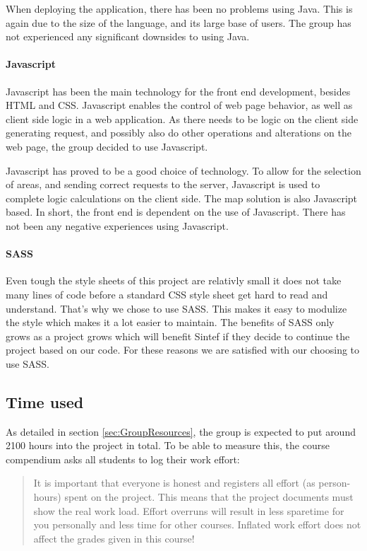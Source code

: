 \documentclass[11pt,a4paper,titlepage,oneside]{report}
\begin{document}
When deploying the application, there has been no problems using Java. This is again due to the size of the language, and its large base of users. The group has not experienced any significant downsides to using Java. 

\paragraph{Javascript}
Javascript has been the main technology for the front end development, besides \gls{HTML} and \gls{CSS}. Javascript enables the control of web page behavior, as well as client side logic in a web application. As there needs to be logic on the client side generating request, and possibly also do other operations and alterations on the web page, the group decided to use Javascript. 

Javascript has proved to be a good choice of technology. To allow for the selection of areas, and sending correct requests to the server, Javascript is used to complete logic calculations on the client side. The map solution is also Javascript based. In short, the front end is dependent on the use of Javascript. There has not been any negative experiences using Javascript. 

\paragraph{SASS}
Even tough the style sheets of this project are relativly small it does not take many lines of code before a standard \gls{CSS} style sheet get hard to read and understand. That's why we chose to use \gls{SASS}. This makes it easy to modulize the style which makes it a lot easier to maintain. The benefits of \gls{SASS} only grows as a project grows which will benefit Sintef if they decide to continue the project based on our code. For these reasons we are satisfied with our choosing to use \gls{SASS}.

\subsection{Time used}
\label{subsec:TimeUsed}
As detailed in section \ref{sec:GroupResources}, the group is expected to put around 2100 hours into the project in total. To be able to measure this, the \gls{course compendium} asks all students to log their work effort:

\begin{quote}
It is important that everyone is honest and registers all effort (as person-hours) spent on the project. This means that the project documents must show the real work load. Effort overruns will result in less sparetime for you personally and less time for other courses. Inflated work effort does not affect the grades given in this course! \cite{TDT4290:Intro}
\end{quote}
\end{document}
